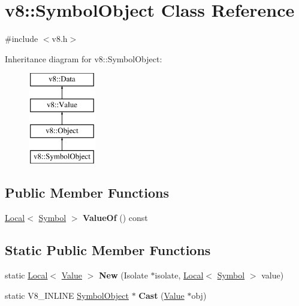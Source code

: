 \hypertarget{classv8_1_1SymbolObject}{}\section{v8\+:\+:Symbol\+Object Class Reference}
\label{classv8_1_1SymbolObject}


{\ttfamily \#include $<$v8.\+h$>$}

Inheritance diagram for v8\+:\+:Symbol\+Object\+:\begin{figure}[H]
\begin{center}
\leavevmode
\includegraphics[height=4.000000cm]{classv8_1_1SymbolObject}
\end{center}
\end{figure}
\subsection*{Public Member Functions}
\begin{DoxyCompactItemize}
\item 
\mbox{\label{classv8_1_1SymbolObject_a07e6a12e98b3787165addcafd9273aa7}} 
\mbox{\hyperlink{classv8_1_1Local}{Local}}$<$ \mbox{\hyperlink{classv8_1_1Symbol}{Symbol}} $>$ {\bfseries Value\+Of} () const
\end{DoxyCompactItemize}
\subsection*{Static Public Member Functions}
\begin{DoxyCompactItemize}
\item 
\mbox{\label{classv8_1_1SymbolObject_a3a3dc109d1207e4fe20671c17f5426c0}} 
static \mbox{\hyperlink{classv8_1_1Local}{Local}}$<$ \mbox{\hyperlink{classv8_1_1Value}{Value}} $>$ {\bfseries New} (Isolate $\ast$isolate, \mbox{\hyperlink{classv8_1_1Local}{Local}}$<$ \mbox{\hyperlink{classv8_1_1Symbol}{Symbol}} $>$ value)
\item 
\mbox{\label{classv8_1_1SymbolObject_a03322931e62adfd4e5d184d15d5e4af9}} 
static V8\+\_\+\+I\+N\+L\+I\+NE \mbox{\hyperlink{classv8_1_1SymbolObject}{Symbol\+Object}} $\ast$ {\bfseries Cast} (\mbox{\hyperlink{classv8_1_1Value}{Value}} $\ast$obj)
\end{DoxyCompactItemize}


